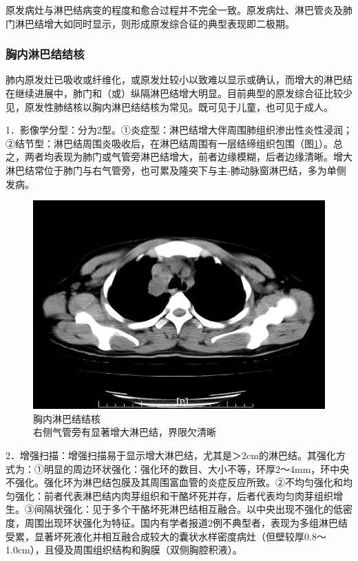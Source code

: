 原发病灶与淋巴结病变的程度和愈合过程并不完全一致。原发病灶、淋巴管炎及肺门淋巴结增大如同时显示，则形成原发综合征的典型表现即二极期。

\subsubsection{胸内淋巴结结核}

肺内原发灶已吸收或纤维化，或原发灶较小以致难以显示或确认，而增大的淋巴结在继续进展中，肺门和（或）纵隔淋巴结增大明显。目前典型的原发综合征比较少见，原发性肺结核以胸内淋巴结结核为常见。既可见于儿童，也可见于成人。

1．影像学分型：分为2型。①炎症型：淋巴结增大伴周围肺组织渗出性炎性浸润；②结节型：淋巴结周围炎吸收后，在淋巴结周围有一层结缔组织包围（图\ref{fig9-21}）。总之，两者均表现为肺门或气管旁淋巴结增大，前者边缘模糊，后者边缘清晰。增大淋巴结常位于肺门与右气管旁，也可累及隆突下与主-肺动脉窗淋巴结，多为单侧发病。

\begin{figure}[!htbp]
 \centering
 \includegraphics[width=.7\textwidth,height=\textheight,keepaspectratio]{./images/Image00208.jpg}
 \captionsetup{justification=centering}
 \caption{胸内淋巴结结核\\{\small 右侧气管旁有显著增大淋巴结，界限欠清晰}}
 \label{fig9-21}
  \end{figure} 

2．增强扫描：增强扫描易于显示增大淋巴结，尤其是＞2cm的淋巴结。其强化方式为：①明显的周边环状强化：强化环的数目、大小不等，环厚2～4mm，环中央不强化。强化环为淋巴结包膜及其周围富血管的炎症反应所致。②不均匀强化和均匀强化：前者代表淋巴结内肉芽组织和干酪坏死并存，后者代表均匀肉芽组织增生。③间隔状强化：见于多个干酪坏死淋巴结相互融合。以中央出现不强化的低密度，周围出现环状强化为特征。国内有学者报道2例不典型者，表现为多组淋巴结受累，显著坏死液化并相互融合成较大的囊状水样密度病灶（但壁较厚0.8～1.0cm），且侵及周围组织结构和胸膜（双侧胸腔积液）。

